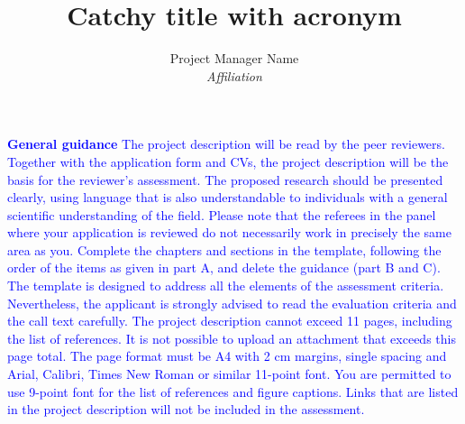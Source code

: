 \documentclass[a4paper,11pt]{article}
\renewcommand{\footnotesize}{\normalfont\fontsize{9pt}{11pt}\selectfont}
\newcommand{\instructions}[1]{\textcolor{blue}{#1}}
\begin{document}
\title{Catchy title with acronym}



\author{
Project Manager Name \\
{\it Affiliation}
}

\date{}
\maketitle
\instructions{\textbf{General guidance}
The project description will be read by the peer reviewers. Together with the application form and CVs, the project description will be the basis for the reviewer's assessment. The proposed research should be presented clearly, using language that is also understandable to individuals with a general scientific understanding of the field. Please note that the referees in the panel where your application is reviewed do not necessarily work in precisely the same area as you.
Complete the chapters and sections in the template, following the order of the items as given in part A, and delete the guidance (part B and C). The template is designed to address all the elements of the assessment criteria. Nevertheless, the applicant is strongly advised to read the evaluation criteria and the call text carefully. 
The project description cannot exceed 11 pages, including the list of references. It is not possible to upload an attachment that exceeds this page total. The page format must be A4 with 2 cm margins, single spacing and Arial, Calibri, Times New Roman or similar 11-point font. You are permitted to use 9-point font for the list of references and figure captions. Links that are listed in the project description will not be included in the assessment.}




\AtNextBibliography{\footnotesize}
\setlength{\bibitemsep}{0pt}


\printbibliography 
\end{document}
